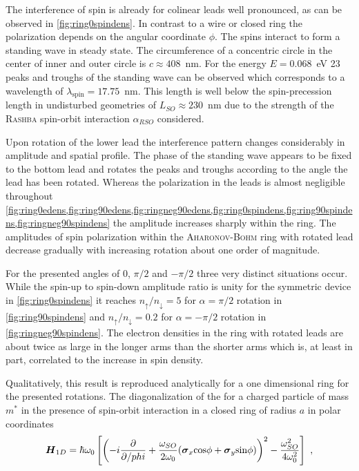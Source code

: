 The interference of spin is already for colinear leads well pronounced, as can be observed in \cref{fig:ring0spindens}. In contrast to a wire or closed ring \cite{PhysRevB.82.165322} the polarization depends on the angular coordinate $\phi$.
The spins interact to form a standing wave in steady state. The circumference of a concentric circle in the center of inner and outer circle is $c\approx 408$~nm. For the energy $E=0.068$~eV 23 peaks and troughs of the standing wave can be observed which corresponds to a wavelength of $\lambda_{\text{spin}}=17.75$~nm. This length is well below the spin-precession length in undisturbed geometries of $L_{SO}\approx230$~nm due to the strength of the \textsc{Rashba} spin-orbit interaction $\alpha_{RSO}$ considered.\par
Upon rotation of the lower lead the interference pattern changes considerably in amplitude and spatial profile. The phase of the standing wave appears to be fixed to the bottom lead and rotates the peaks and troughs according to the angle the lead has been rotated. Whereas the polarization in the leads is almost negligible throughout \cref{fig:ring0edens,fig:ring90edens,fig:ringneg90edens,fig:ring0spindens,fig:ring90spindens,fig:ringneg90spindens} the amplitude increases sharply within the ring. The amplitudes of spin polarization within the \textsc{Aharonov-Bohm} ring with rotated lead decrease gradually with increasing rotation about one order of magnitude.\par
For the presented angles of 0, $\pi/2$ and $-\pi/2$ three very distinct situations occur. While the spin-up to spin-down amplitude ratio is unity for the symmetric device in \cref{fig:ring0spindens} it reaches $n_{\uparrow}/n_{\downarrow}=5$ for $\alpha=\pi/2$ rotation in \cref{fig:ring90spindens} and $n_{\uparrow}/n_{\downarrow}=0.2$ for $\alpha=-\pi/2$ rotation in \cref{fig:ringneg90spindens}. The electron densities in the ring with rotated leads are about twice as large in the longer arms than the shorter arms which is, at least in part, correlated to the increase in spin density.\par
Qualitatively, this result is reproduced analytically for a one dimensional ring for the presented rotations. The diagonalization of the \hamil{} for a charged particle of mass $m^*$ in the presence of spin-orbit interaction in a closed ring of radius $a$ in polar coordinates \cite{PhysRevB.73.155325} 
\begin{align}
\mat{H}_{1D}=\hbar\omega_0 \left[\left(-i\pd{}{/phi}+\frac{\omega_{SO}}{2\omega_{0}} (\mat{\sigma}_x\text{cos}\phi+\mat{\sigma}_y\text{sin}\phi)\right)^2-\frac{\omega_{SO}^2}{4\omega_0^2}\right]\ ,
\end{align}
